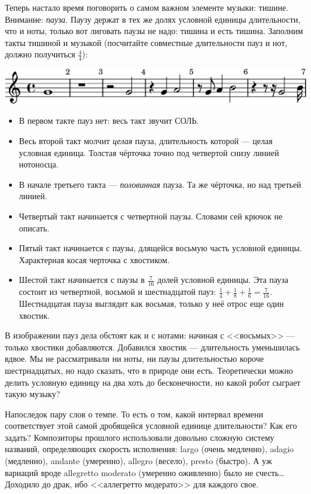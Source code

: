 Теперь настало время поговорить о самом важном элементе музыки: тишине. Внимание: \emph{пауза}. Паузу держат в тех же долях условной единицы длительности, что и ноты, только вот лиговать паузы не надо: тишина и есть тишина. Заполним такты тишиной и музыкой (посчитайте совместные длительности пауз и нот, должно получиться $\frac{4}{4}$): 
\begin{center}
    \includegraphics{fig/notes/pause}
\end{center}
\begin{itemize}
    \item В первом такте пауз нет: весь такт звучит СОЛЬ.
    \item Весь второй такт молчит \emph{целая} пауза, длительность которой --- целая условная единица. Толстая чёрточка точно под четвертой снизу линией нотоносца.
    \item В начале третьего такта --- \emph{половинная} пауза. Та же чёрточка, но над третьей линией.
    \item Четвертый такт начинается с четвертной паузы. Словами сей крючок не описать.
    \item Пятый такт начинается с паузы, длящейся восьмую часть условной единицы. Характерная косая черточка с хвостиком.
    \item Шестой такт начинается с паузы в $\frac{7}{16}$ долей условной единицы. Эта пауза состоит из четвертной, восьмой и шестнадцатой пауз: $\frac{1}{4} + \frac{1}{8} + \frac{1}{6} = \frac{7}{16}$. Шестнадцатая пауза выглядит как восьмая, только у неё отрос еще один хвостик. 
\end{itemize}

В изображении пауз дела обстоят как и с нотами: начиная с <<восьмых>> --- только хвостики добавляются. Добавился хвостик --- длительность уменьшилась вдвое. Мы не рассматривали ни ноты, ни паузы длительностью короче шестрнадцатых, но надо сказать, что в природе они есть. Теоретически можно делить условную единицу на два хоть до бесконечности, но какой робот сыграет такую музыку?

Напоследок пару слов о темпе. То есть о том, какой интервал времени соответствует этой самой дробящейся условной единице длительности? Как его задать? Композиторы прошлого использовали довольно сложную систему названий, определяющих скорость исполнения: largo (очень медленно), adagio (медленно), andante (умеренно), allegro (весело), presto (быстро). А уж вариаций вроде allegretto moderato (умеренно оживленно) было не счесть\ldots Доходило до драк, ибо <<аллегретто модерато>> для каждого свое. 

